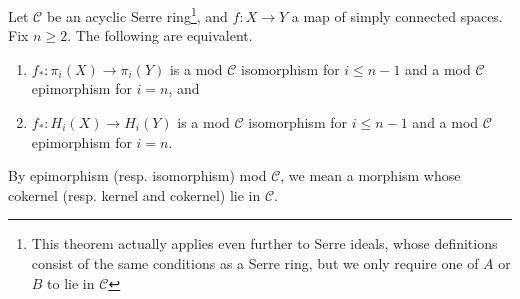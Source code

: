 \begin{theorem}
     Let $\mathscr{C}$ be an acyclic Serre ring\footnote{This theorem actually applies even further to Serre ideals, whose definitions consist of the same conditions as a Serre ring, but we only require one of $A$ or $B$ to lie in $\mathscr C$}, and $f : X \to Y$ a map of simply connected spaces. Fix $n \geq 2$. The following are equivalent.
    \begin{enumerate}
        \item[(i)] $f_* : \pi_i(X) \to \pi_i(Y)$ is a mod $\mathscr{C}$ isomorphism for $i \leq n-1$ and a mod $\mathscr{C}$ epimorphism for $i = n$, and
        \item[(ii)] $f_* : H_i(X) \to H_i(Y)$ is a mod $\mathscr{C}$ isomorphism for $i \leq n-1$ and a mod $\mathscr{C}$ epimorphism for $i = n$.
    \end{enumerate}
\end{theorem}
By epimorphism (resp. isomorphism) mod $\mathscr C$, we mean a morphism whose cokernel (resp. kernel and cokernel) lie in $\mathscr C$.
